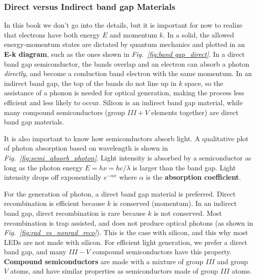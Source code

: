 \subsubsection*{Direct versus Indirect band gap Materials}
In this book we don't go into the details, but it is important for now to realize that electrons have both energy $E$ and momentum $k$.  In a solid, the allowed energy-momentum states are dictated by quantum mechanics and plotted in an \textbf{E-k diagram}, such as the ones shown in \emph{Fig.~\ref{fig:band gap_direct}}.  In a direct band gap semiconductor, the bands overlap and an electron can absorb a photon \emph{directly}, and become a conduction band electron with the same momentum.   In an indirect band gap, the top of the bands do not line up in $k$ space, so the assistance of a phonon is needed for optical generation, making the process less efficient and less likely to occur.  Silicon is an indirect band gap material, while many compound semiconductors (group $III + V$ elements together) are direct band gap materials.

It is also important to know how semiconductors absorb light.  A qualitative plot of photon absorption based on wavelength is shown in \emph{Fig.~\ref{fig:semi_absorb_photon}}.  Light intensity is absorbed by a semiconductor as long as the photon energy $E = h\nu = hc/\lambda $ is larger than the band gap.   Light intensity drops off exponentially $e^{-\alpha x}$ where $\alpha$ is the \textbf{absorption coefficient}.  

For the generation of photon, a direct band gap material is preferred.  Direct recombination is efficient because $k$ is conserved (momentum).  In an indirect band gap, direct recombination is rare because $k$ is not conserved.  Most recombination is trap assisted, and does not produce optical photons (as shown in \emph{Fig.~\ref{fig:rad_vs_nonrad_reco}}).  This is the case with silicon, and this why most LEDs are not made with silicon. For efficient light generation, we prefer a direct band gap, and many $III-V$ compound semiconductors have this property.  \textbf{Compound semiconductors} are made with a mixture of group $III$ and group $V$ atoms, and have similar properties as semiconductors made of group $III$ atoms.
